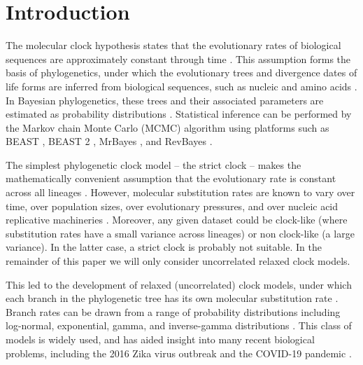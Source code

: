 \documentclass[10pt,letterpaper]{article}
\begin{document}
\linenumbers

\clearpage
\section*{Introduction}


The molecular clock hypothesis states that the evolutionary rates of biological sequences are approximately constant through time \cite{zuckerkandl1962molecular}.
This assumption forms the basis of phylogenetics, under which the evolutionary trees and divergence dates of life forms are inferred from biological sequences, such as nucleic and amino acids \cite{douzery2003local, drummond2006relaxed}.
In Bayesian phylogenetics, these trees and their associated parameters are estimated as probability distributions \cite{kuhner1995estimating, larget1999markov, mau1999bayesian}. 
Statistical inference can be performed by the Markov chain Monte Carlo (MCMC) algorithm \cite{metropolis53, hastings70} using platforms such as BEAST \cite{drummond2012bayesian}, BEAST 2 \cite{bouckaert2019beast}, MrBayes \cite{ronquist2012mrbayes}, and RevBayes \cite{hohna2016revbayes}.



The simplest phylogenetic clock model -- the strict clock -- makes the mathematically convenient assumption that the evolutionary rate is constant across all lineages \cite{zuckerkandl1965evolutionary, kuhner1995estimating, larget1999markov}.  %
However, molecular substitution rates are known to vary over time, over population sizes, over evolutionary pressures, and over nucleic acid replicative machineries \cite{gillespie1994causes, woolfit2009effective, loh2010optimization}.
Moreover, any given dataset could be clock-like (where substitution rates have a small variance across lineages) or non clock-like (a large variance). 
In the latter case, a strict clock is probably not suitable. 
In the remainder of this paper %
we will only consider uncorrelated relaxed clock models.


This led to the development of relaxed (uncorrelated) clock models, under which each branch in the phylogenetic tree has its own molecular substitution rate  \cite{drummond2006relaxed}.
Branch rates can be drawn from a range of probability distributions including log-normal, exponential, gamma, and inverse-gamma distributions \cite{drummond2006relaxed, lepage2007general, li2012model}.
This class of models is widely used, and has aided insight into many recent biological problems, including the 2016 Zika virus outbreak \cite{faria2017establishment} and the COVID-19 pandemic \cite{giovanetti2020first}.
\end{document}
